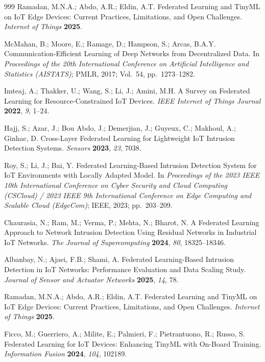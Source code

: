 \documentclass[journal,article,submit,moreauthors]{Definitions/mdpi}
\begin{document}
{\begin{thebibliography}{999}
Ramadan, M.N.A.; Abdo, A.R.; Eldin, A.T. Federated Learning and TinyML on IoT Edge Devices: Current Practices, Limitations, and Open Challenges. \emph{Internet of Things} \textbf{2025}.

McMahan, B.; Moore, E.; Ramage, D.; Hampson, S.; Arcas, B.A.Y. Communication-Efficient Learning of Deep Networks from Decentralized Data. In \emph{Proceedings of the 20th International Conference on Artificial Intelligence and Statistics (AISTATS)}; PMLR, 2017; Vol.~54, pp.~1273--1282.

Imteaj, A.; Thakker, U.; Wang, S.; Li, J.; Amini, M.H. A Survey on Federated Learning for Resource-Constrained IoT Devices. \emph{IEEE Internet of Things Journal} \textbf{2022}, \emph{9}, 1--24.

Hajj, S.; Azar, J.; Bou Abdo, J.; Demerjian, J.; Guyeux, C.; Makhoul, A.; Ginhac, D. Cross-Layer Federated Learning for Lightweight IoT Intrusion Detection Systems. \emph{Sensors} \textbf{2023}, \emph{23}, 7038.

Roy, S.; Li, J.; Bai, Y. Federated Learning-Based Intrusion Detection System for IoT Environments with Locally Adapted Model. In \emph{Proceedings of the 2023 IEEE 10th International Conference on Cyber Security and Cloud Computing (CSCloud) / 2023 IEEE 9th International Conference on Edge Computing and Scalable Cloud (EdgeCom)}; IEEE, 2023; pp.~203--209.

Chaurasia, N.; Ram, M.; Verma, P.; Mehta, N.; Bharot, N. A Federated Learning Approach to Network Intrusion Detection Using Residual Networks in Industrial IoT Networks. \emph{The Journal of Supercomputing} \textbf{2024}, \emph{80}, 18325--18346.

Albanbay, N.; Ajaei, F.B.; Shami, A. Federated Learning-Based Intrusion Detection in IoT Networks: Performance Evaluation and Data Scaling Study. \emph{Journal of Sensor and Actuator Networks} \textbf{2025}, \emph{14}, 78.

Ramadan, M.N.A.; Abdo, A.R.; Eldin, A.T. Federated Learning and TinyML on IoT Edge Devices: Current Practices, Limitations, and Open Challenges. \emph{Internet of Things} \textbf{2025}.

Ficco, M.; Guerriero, A.; Milite, E.; Palmieri, F.; Pietrantuono, R.; Russo, S. Federated Learning for IoT Devices: Enhancing TinyML with On-Board Training. \emph{Information Fusion} \textbf{2024}, \emph{104}, 102189.


\end{thebibliography}}
\end{document}
